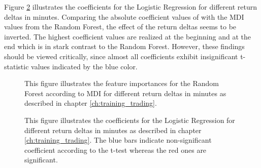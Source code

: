 Figure \ref{fig:logistic_coefficients} illustrates the coefficients for the Logistic Regression 
for different return deltas in minutes. Comparing the absolute coefficient values of with the MDI values 
from the Random Forest, the effect of the return deltas seems to be inverted. 
The highest coefficient values are realized at the beginning and at the end which is
in stark contrast to the Random Forest. However, these findings should be viewed critically, 
since almost all coefficients exhibit insignificant t-statistic values indicated by the blue color.


\begin{figure}[H]
    \captionsetup{format=plain}
    \caption{ 
            This figure illustrates the feature importances for the Random Forest according to MDI \cite{louppe2015variableImportance}
            for different return deltas in minutes as described in chapter \ref{ch:training_trading}.
        }
    \label{fig:rf_feature_importances}
\end{figure}

\begin{figure}[H]
    \captionsetup{format=plain}
    \caption{ 
            This figure illustrates the coefficients for the Logistic Regression 
            for different return deltas in minutes as described in chapter \ref{ch:training_trading}.
            The blue bars indicate non-significant coefficient according to the t-test whereas the red ones are
            significant.
        }
    \label{fig:logistic_coefficients}
\end{figure}
